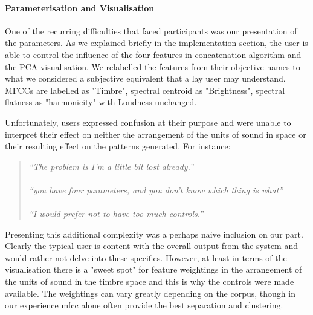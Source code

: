 \paragraph{Parameterisation and Visualisation}

One of the recurring difficulties that faced participants was our presentation of the parameters. As we explained briefly in the implementation section, the user is able to control the influence of the four features in concatenation algorithm and the PCA visualisation. We relabelled the features from their objective names to what we considered a subjective equivalent that a lay user may understand. MFCCs are labelled as "Timbre", spectral centroid as "Brightness", spectral flatness as "harmonicity" with Loudness unchanged.  

Unfortunately, users expressed confusion at their purpose and were unable to interpret their effect on neither the arrangement of the units of sound in space or their resulting effect on the patterns generated. For instance:

\blockquote{\textit{
“The problem is I'm a little bit lost already.”\\\\
“you have four parameters, and you don't know which thing is what”\\\\
“I would prefer not to have too much controls.”
}}

Presenting this additional complexity was a perhaps naive inclusion on our part. Clearly the typical user is content with the overall output from the system and would rather not delve into these specifics. However, at least in terms of the visualisation there is a "sweet spot" for feature weightings in the arrangement of the units of sound in the timbre space and this is why the controls were made available. The weightings can vary greatly depending on the corpus, though in our experience \acrshort{mfcc} alone often provide the best separation and clustering.

